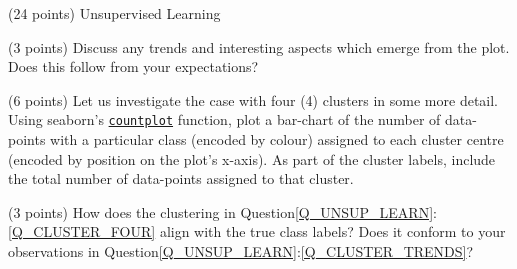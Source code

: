 \documentclass[12pt]{article}
\begin{document}
\begin{question}{\label{Q_UNSUP_LEARN}(24 points) Unsupervised Learning}
\begin{subquestion}
\end{subquestion}

\begin{subquestion}{\label{Q_CLUSTER_TRENDS}(3 points) Discuss any trends and interesting aspects which emerge from the plot. Does this follow from your expectations?}






\end{subquestion}

\begin{subquestion}{\label{Q_CLUSTER_FOUR}(6 points) Let us investigate the case with four (4) clusters in some more detail. Using seaborn's \href{https://seaborn.pydata.org/generated/seaborn.countplot.html}{\texttt{countplot}} function, plot a bar-chart of the number of data-points with a particular class (encoded by colour) assigned to each cluster centre (encoded by position on the plot's x-axis). As part of the cluster labels, include the total number of data-points assigned to that cluster.}






\end{subquestion}

\begin{subquestion}{(3 points) How does the clustering in Question\ref{Q_UNSUP_LEARN}:\ref{Q_CLUSTER_FOUR} align with the true class labels? Does it conform to your observations in Question\ref{Q_UNSUP_LEARN}:\ref{Q_CLUSTER_TRENDS}?}




\end{subquestion}
\end{question}
\end{document}
